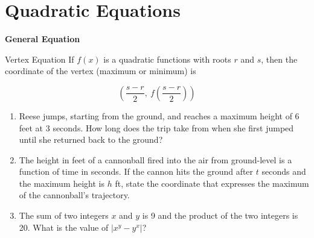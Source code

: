 \section{Quadratic Equations}

\bigskip
\textbf{General Equation}

\bigskip
\begin{equationbox}{Vertex Equation}
If $f(x)$ is a quadratic functions with roots $r$ and $s$, then the coordinate of the vertex (maximum or minimum) is

\[\left(\frac{s-r}{2},\ f\left(\frac{s-r}{2}\right)\right)\]

\end{equationbox}

\bigskip
\begin{enumerate}[labelindent=*,style=multiline,leftmargin=*,label=\textbf{Example \arabic*:}]
\item Reese jumps, starting from the ground, and reaches a maximum height of 6 feet at 3 seconds. How long does the trip take from when she first jumped until she returned back to the ground?

\vfill\item The height in feet of a cannonball fired into the air from ground-level is a function of time in seconds. If the cannon hits the ground after $t$ seconds and the maximum height is $h$ ft, state the coordinate that expresses the maximum of the cannonball's trajectory.

\vfill\item The sum of two integers $x$ and $y$ is 9 and the product of the two integers is 20. What is the value of $|x^y-y^x|$?
\end{enumerate}

